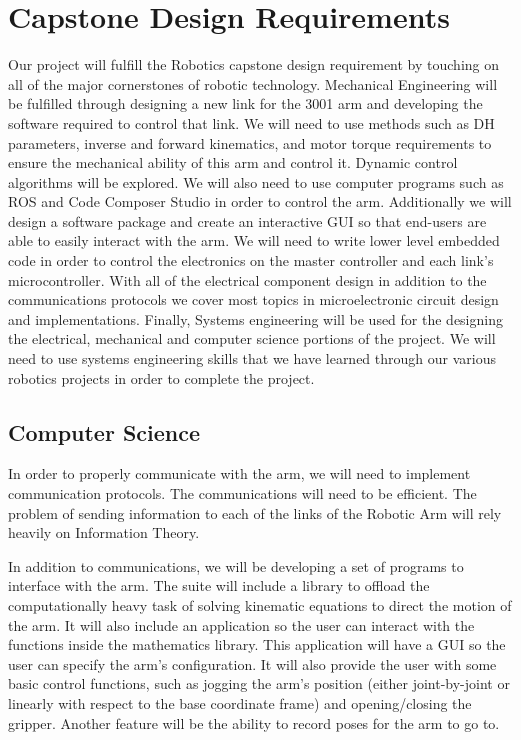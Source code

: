 \section{Capstone Design Requirements}
Our project will fulfill the Robotics capstone design requirement by touching on all of the major cornerstones of robotic technology. Mechanical Engineering will be fulfilled through designing a new link for the 3001 arm and developing the software required to control that link. We will need to use methods such as DH parameters, inverse and forward kinematics, and motor torque requirements to ensure the mechanical ability of this arm and control it. Dynamic control algorithms will be explored. We will also need to use computer programs such as ROS and Code Composer Studio in order to control the arm. Additionally we will design a software package and create an interactive GUI so that end-users are able to easily interact with the arm. We will need to write lower level embedded code in order to control the electronics on the master controller and each link's microcontroller. With all of the electrical component design in addition to the communications protocols we cover most topics in microelectronic circuit design and implementations. Finally, Systems engineering will be used for the designing the electrical, mechanical and computer science portions of the project. We will need to use systems engineering skills that we have learned through our various robotics projects in order to complete the project.
\subsection{Computer Science}
In order to properly communicate with the arm, we will need to implement communication protocols. The communications will need to be efficient. The problem of sending information to each of the links of the Robotic Arm will rely heavily on Information Theory.

\noindent In addition to communications, we will be developing a set of programs to interface with the arm. The suite will include a library to offload the computationally heavy task of solving kinematic equations to direct the motion of the arm. It will also include an application so the user can interact with the functions inside the mathematics library. This application will have a GUI so the user can specify the arm's configuration. It will also provide the user with some basic control functions, such as jogging the arm's position (either joint-by-joint or linearly with respect to the base coordinate frame) and opening/closing the gripper. Another feature will be the ability to record poses for the arm to go to.

